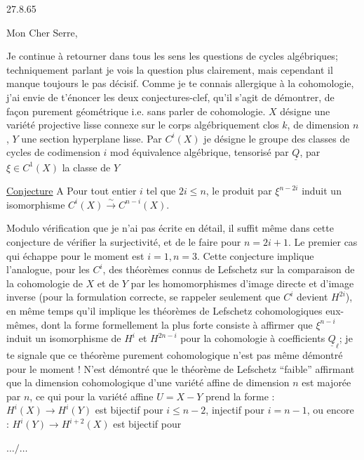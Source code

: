 27.8.65

Mon Cher Serre,

Je continue à retourner dans tous les sens les questions de cycles algébriques; techniquement parlant je vois la question plus clairement, mais cependant il manque toujours le pas décisif. Comme je te connais allergique à la cohomologie, j'ai envie de t'énoncer les deux conjectures-clef, qu'il s'agit de démontrer, de façon purement géométrique i.e. sans parler de cohomologie. $X$ désigne une variété projective lisse connexe sur le corps algébriquement clos $k$, de dimension $n$, $Y$ une section hyperplane lisse. Par $C^i(X)$ je désigne le groupe des classes de cycles de codimension $i$ mod équivalence algébrique, tensorisé par $\underline{Q}$, par $\xi\in C^1(X)$ la classe de $Y$

\uline{Conjecture} A Pour tout entier $i$ tel que $2i\leq n$, le produit par $\xi^{n-2i}$ induit un isomorphisme $C^i(X)\xrightarrow{\sim}C^{n-i}(X)$.

Modulo vérification que je n'ai pas écrite en détail, il suffit même dans cette conjecture de vérifier la surjectivité, et de le faire pour $n=2i+1$. Le premier cas qui échappe pour le moment est $i=1,n=3$. Cette conjecture implique l'analogue, pour les $C^i$, des théorèmes connus de Lefschetz sur la comparaison de la cohomologie de $X$ et de $Y$ par les homomorphismes d'image directe et d'image inverse (pour la formulation correcte, se rappeler seulement que $C^i$ devient $H^{2i}$), en même temps qu'il implique les théorèmes de Lefschetz cohomologiques eux-mêmes, dont la forme formellement la plus forte consiste à affirmer que $\xi^{n-i}$ induit un isomorphisme de $H^i$ et $H^{2n-i}$ pour la cohomologie à coefficients $\underline{Q}_\ell$; je te signale que ce théorème purement cohomologique n'est pas même démontré pour le moment ! N'est démontré que le théorème de Lefschetz ``faible'' affirmant que la dimension cohomologique d'une variété affine de dimension $n$ est majorée par $n$, ce qui pour la variété affine $U=X-Y$ prend la forme : $H^i(X)\longrightarrow H^i(Y)$ est bijectif pour $i\leq n-2$, injectif pour $i=n-1$, ou encore : $H^i(Y)\longrightarrow H^{i+2}(X)$ est bijectif pour

\hfill $\ldots/\ldots$

